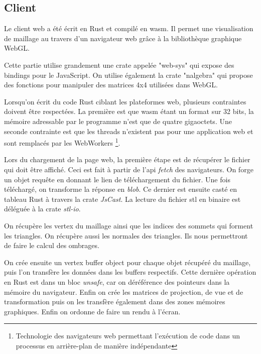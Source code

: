 \subsection{Client}

Le client web a été écrit en Rust et compilé en \gls{wasm}.
Il permet une visualisation de maillage au travers d'un navigateur web grâce à
la bibliothèque graphique WebGL.

Cette partie utilise grandement une crate appelée "web-sys" qui expose des bindings pour le JavaScript.
On utilise également la crate "nalgebra" qui propose des fonctions pour manipuler des matrices 4x4 utilisées dans WebGL.

Lorsqu'on écrit du code Rust ciblant les plateformes web, plusieurs contraintes
doivent être respectées. La première est que \gls{wasm} étant un format sur 32
bits, la mémoire adressable par le programme n'est que de quatre gigaoctets. Une
seconde contrainte est que les threads n'existent pas pour une application web
et sont remplacés par les WebWorkers
\footnote{Technologie des navigateurs web permettant l'exécution de
code dans un processus en arrière-plan de manière indépendante}.

Lors du chargement de la page web, la première étape est de récupérer le fichier
qui doit être affiché.
Ceci est fait à partir de l'\gls{api} \textit{fetch} des
navigateurs. On forge un objet requête en donnant le lien de téléchargement du
fichier. Une fois téléchargé, on transforme la réponse en \textit{blob}.
Ce dernier est ensuite casté en tableau Rust à travers la crate \textit{JsCast}.
La lecture du fichier \gls{stl} en binaire est déléguée à la crate \textit{stl-io}.

On récupère les vertex du maillage ainsi que les indices des sommets qui forment les
triangles. On récupère aussi les normales des triangles. Ils nous permettront de
faire le calcul des ombrages.

On crée ensuite un vertex buffer object pour chaque objet récupéré du
maillage, puis l'on transfère les données dans les buffers respectifs.
Cette dernière opération en Rust est dans un bloc \textit{unsafe}, car on déréférence des
pointeurs dans la mémoire du navigateur.
Enfin on crée les matrices de projection, de vue et de transformation 
puis on les transfère également dans des zones mémoires graphiques.
Enfin on ordonne de faire un rendu à l'écran.
